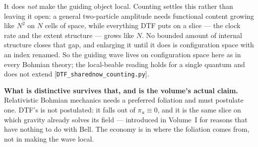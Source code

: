 \documentclass[11pt]{article}
\begin{document}
\noindent It does \emph{not} make the guiding object local. Counting settles this rather than leaving it
open: a general two-particle amplitude needs functional content growing like $N^2$ on $N$ cells of space,
while everything DTF puts on a slice --- the clock rate and the extent structure --- grows like $N$. No
bounded amount of internal structure closes that gap, and enlarging it until it does is configuration space
with an index renamed. So the guiding wave lives on configuration space here as in every Bohmian theory;
the local-beable reading holds for a single quantum and does not extend
[\texttt{DTF\_sharednow\_counting.py}].

\noindent \textbf{What is distinctive survives that, and is the volume's actual claim.} Relativistic
Bohmian mechanics needs a preferred foliation and must postulate one. DTF's is not postulated: it falls
out of $\pi_u\equiv0$, and it is the same slice on which gravity already solves its field --- introduced
in Volume~I for reasons that have nothing to do with Bell. The economy is in where the foliation comes
from, not in making the wave local.
\end{document}

